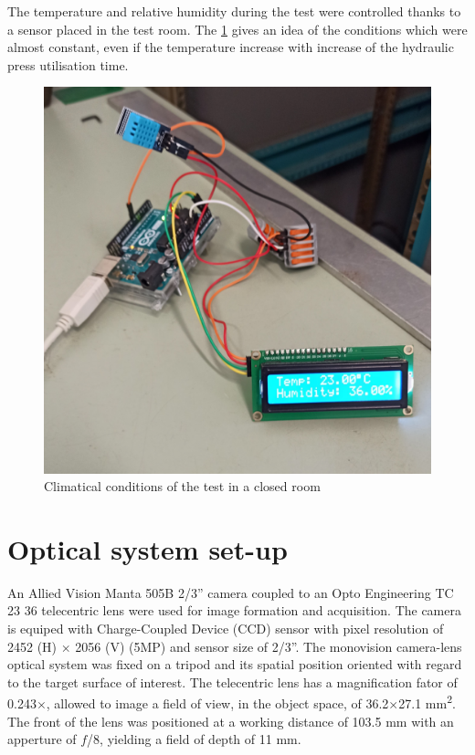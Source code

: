 The temperature and relative humidity during the test were controlled thanks to a sensor placed in the test room. The \ref{fig:Fig19} gives an idea of the conditions which were almost constant, even if the temperature increase with increase of the hydraulic press utilisation time.

\begin{figure}[t]
	\centering
	\includegraphics[scale=0.08]{Figures/Temperature_ relative_humidity}
	\decoRule
	\caption[Climatical conditions of the test]{Climatical conditions of the test in a closed room}
	\label{fig:Fig19}
\end{figure}

\section{Optical system set-up}

An Allied Vision Manta 505B 2/3'' camera coupled to an Opto Engineering TC 23 36 telecentric lens were used for image formation and acquisition. The camera is equiped with Charge-Coupled Device (CCD) sensor with pixel resolution of 2452 (H) $\times$ 2056 (V) (5MP) and sensor size of 2/3''. The monovision camera-lens optical system was fixed on a tripod and its spatial position oriented with regard to the target surface of interest. The telecentric lens has a magnification fator of \num{0.243}$\times$, allowed to image a field of view, in the object space, of 36.2$\times$27.1 \si{\milli\meter\squared}. The front of the lens was positioned at a working distance of 103.5 \si{\milli\meter} with an apperture of $f$/8, yielding a field of depth of 11 \si{\milli\meter}.


